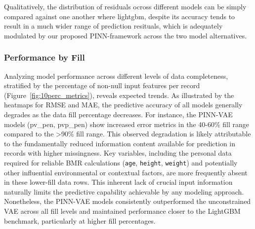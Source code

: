 Qualitatively, the distribution of residuals ocross different models can be simply compared against one another where lightgbm, despite its accuracy tends to result in a much wider range of prediction resituals, which is adequately modulated by our proposed PINN-framework across the two model alternatives. 

\subsubsection{Performance by Fill}

Analyzing model performance across different levels of data completeness, stratified by the percentage of non-null input features per record (Figure~\ref{fig:10perc_metrics}), reveals expected trends. As illustrated by the heatmaps for RMSE and MAE, the predictive accuracy of all models generally degrades as the data fill percentage decreases. For instance, the PINN-VAE models (pv\_pen, pvp\_pen) show increased error metrics in the 40-60\% fill range compared to the >90\% fill range. This observed degradation is likely attributable to the fundamentally reduced information content available for prediction in records with higher missingness. Key variables, including the personal data required for reliable BMR calculations (\texttt{age}, \texttt{height}, \texttt{weight}) and potentially other influential environmental or contextual factors, are more frequently absent in these lower-fill data rows. This inherent lack of crucial input information naturally limits the predictive capability achievable by any modeling approach. Nonetheless, the PINN-VAE models consistently outperformed the unconstrained VAE across all fill levels and maintained performance closer to the LightGBM benchmark, particularly at higher fill percentages.


